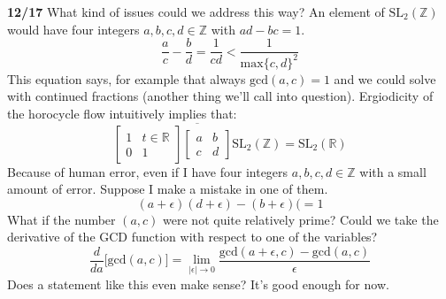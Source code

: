 \documentclass[12pt]{article}
\begin{document}
\noindent \textbf{12/17} What kind of issues could we address this way?  An element of $\text{SL}_2(\mathbb{Z})$ would have four integers $a,b,c,d \in \mathbb{Z}$ with $ad-bc = 1$.  
$$ \frac{a}{c} - \frac{b}{d} = \frac{1}{cd} < \frac{1}{\text{max}\{c,d\}^2} $$
This equation says, for example that always $\text{gcd}(a,c) = 1$ and we could solve with continued fractions  (another thing we'll call into question). Ergiodicity of the horocycle flow intuitively implies that:
$$ 
\overline{\left[ \begin{array}{cr} 1 & t \in \mathbb{R} \\ 0 & 1 \end{array} \right]
\left[ \begin{array}{cc} a & b \\ c & d \end{array} \right] \text{SL}_2(\mathbb{Z})} = \text{SL}_2(\mathbb{R}) $$
Because of human error, even if I have four integers $a,b,c,d \in \mathbb{Z}$ with a small amount of error.  Suppose I make a mistake in one of them.  
$$ (a + \epsilon) (d + \epsilon) - (b + \epsilon)( = 1 $$
What if the number $(a,c)$ were not quite relatively prime?  Could we take the derivative of the GCD function with respect to one of the variables? 
$$ \frac{d}{da} \Big[ \text{gcd}(a,c) \Big]  = \lim_{|\epsilon| \to 0} \frac{\text{gcd}(a + \epsilon,c) - \text{gcd}(a,c)}{\epsilon} $$
Does a statement like this even make sense?  It's good enough for now. \\ \\
\end{document}
